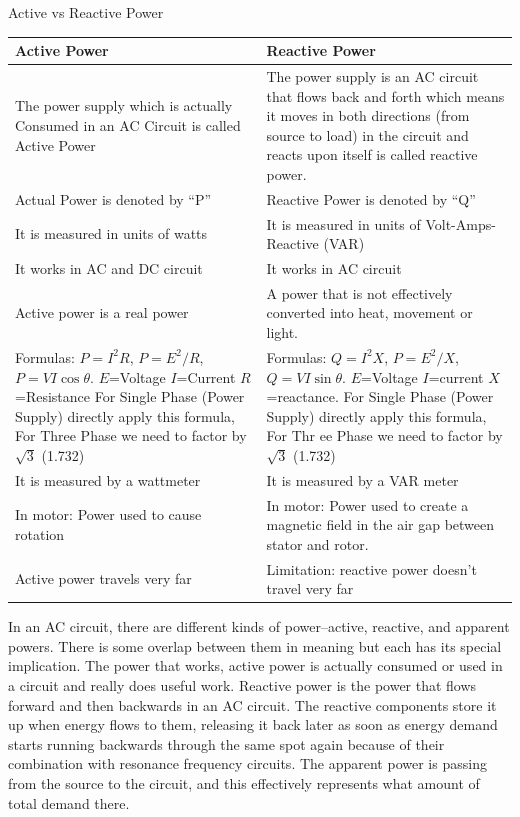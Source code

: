 Active vs Reactive Power
\begin{table}[H]
    \centering
    \begin{tabular}{ |p{}|p{}|}
        \hline
        Active Power & Reactive Power \\ \hline
            The power supply which is actually Consumed in an AC Circuit is called Active Power 
            & The power supply is an AC circuit that flows back and forth which means it moves in both directions (from source to load) in the circuit and reacts upon itself is called reactive power. \\ \hline
            Actual Power is denoted by “P” 
            & Reactive Power is denoted by “Q” \\ \hline
            It is measured in units of watts
            & It is measured in units of Volt-Amps-Reactive (VAR) \\\hline
            It works in AC and DC circuit
            & It works in AC circuit \\ \hline
            Active power is a real power    
            & A power that is not effectively converted into heat, movement or light. \\ \hline
            Formulas:  $P=I^2 R$, $P= E^2/R$, $P=VI \cos{\theta}$. $E$=Voltage $I$=Current $R$=Resistance For Single Phase (Power Supply) directly apply this formula, For Three Phase we need to factor by $\sqrt{3}$ (1.732)
            & Formulas:  $Q=I^2 X$, $P= E^2/X$, $Q=VI \sin{\theta}$. $E$=Voltage $I$=current $X$=reactance. For Single Phase (Power Supply) directly apply this formula, For Thr ee Phase we need to factor by $\sqrt{3}$ (1.732)\\ \hline
            It is measured by a wattmeter
            & It is measured by a VAR meter \\ \hline
            In motor: Power used to cause rotation
            & In motor: Power used to create a magnetic field in the air gap between stator and rotor. \\ \hline
            Active power travels very far 
            & Limitation: reactive power doesn't travel very far \\ \hline
    \end{tabular}
\end{table}

In an AC circuit, there are different kinds of power--active, reactive, and apparent powers. 
There is some overlap between them in meaning but each has its special implication. The power that works, active power is actually consumed or used in a circuit and really does useful work. 
Reactive power is the power that flows forward and then backwards in an AC circuit. 
The reactive components store it up when energy flows to them, releasing it back later as soon as energy demand starts running backwards through the same spot again because of their combination with resonance frequency circuits. 
The apparent power is passing from the source to the circuit, and this effectively represents what amount of total demand there.


